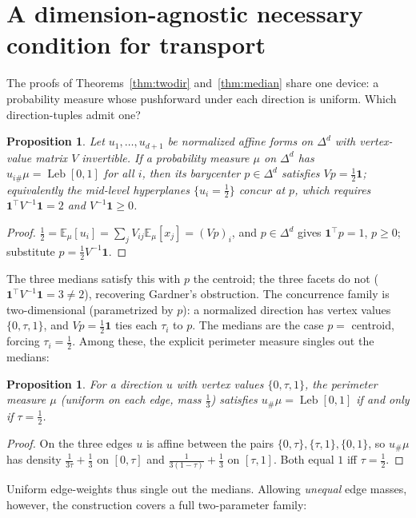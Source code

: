 \documentclass{aims}
\numberwithin{equation}{section}
\theoremstyle{plain}
\newtheorem{proposition}[theorem]{Proposition}
\theoremstyle{definition}
\theoremstyle{remark}
\newcommand{\Leb}{\operatorname{Leb}}
\begin{document}
\section{A dimension-agnostic necessary condition for transport}\label{sec:concur}
The proofs of Theorems~\ref{thm:twodir} and~\ref{thm:median} share one device: a
probability measure whose pushforward under each direction is uniform. Which
direction-tuples admit one?
\begin{proposition}\label{prop:concur}
Let $u_1,\dots,u_{d+1}$ be normalized affine forms on $\Delta^d$ with vertex-value
matrix $V$ invertible. If a probability measure $\mu$ on $\Delta^d$ has
$u_{i\#}\mu=\Leb[0,1]$ for all $i$, then its barycenter $p\in\Delta^d$ satisfies
$Vp=\tfrac12\mathbf 1$; equivalently the mid-level hyperplanes $\{u_i=\tfrac12\}$
concur at $p$, which requires $\mathbf 1^\top V^{-1}\mathbf 1=2$ and
$V^{-1}\mathbf 1\ge0$.
\end{proposition}
\begin{proof}
$\tfrac12=\mathbb E_\mu[u_i]=\sum_j V_{ij}\mathbb E_\mu[x_j]=(Vp)_i$, and
$p\in\Delta^d$ gives $\mathbf 1^\top p=1$, $p\ge0$; substitute $p=\tfrac12V^{-1}\mathbf1$.
\end{proof}
The three medians satisfy this with $p$ the centroid; the three facets do not
($\mathbf 1^\top V^{-1}\mathbf 1=3\ne2$), recovering Gardner's obstruction. The
concurrence family is two-dimensional (parametrized by $p$): a normalized direction
has vertex values $\{0,\tau,1\}$, and $Vp=\tfrac12\mathbf1$ ties each $\tau_i$ to $p$.
The medians are the case $p=$ centroid, forcing $\tau_i=\tfrac12$. Among these, the
explicit perimeter measure singles out the medians:
\begin{proposition}\label{prop:tauhalf}
For a direction $u$ with vertex values $\{0,\tau,1\}$, the perimeter measure $\mu$
(uniform on each edge, mass $\tfrac13$) satisfies $u_\#\mu=\Leb[0,1]$ if and only if
$\tau=\tfrac12$.
\end{proposition}
\begin{proof}
On the three edges $u$ is affine between the pairs $\{0,\tau\},\{\tau,1\},\{0,1\}$,
so $u_\#\mu$ has density $\tfrac1{3\tau}+\tfrac13$ on $[0,\tau]$ and
$\tfrac1{3(1-\tau)}+\tfrac13$ on $[\tau,1]$. Both equal $1$ iff $\tau=\tfrac12$.
\end{proof}
Uniform edge-weights thus single out the medians. Allowing \emph{unequal} edge
masses, however, the construction covers a full two-parameter family:
\end{document}
